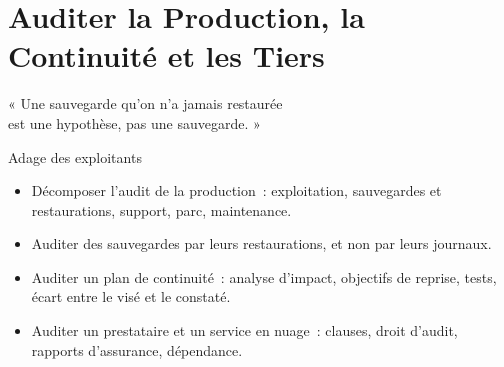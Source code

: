 
\chapter{Auditer la Production, la Continuité et les Tiers}
\label{chap:audit-continuite}

\epigraph{%
    « Une sauvegarde qu'on n'a jamais restaurée\\
    est une hypothèse, pas une sauvegarde. »%
}{Adage des exploitants}


\begin{boxobjectifs}
\begin{itemize}
    \item Décomposer l'audit de la production~: exploitation, sauvegardes et
          restaurations, support, parc, maintenance.
    \item Auditer des sauvegardes par leurs restaurations, et non par leurs
          journaux.
    \item Auditer un plan de continuité~: analyse d'impact, objectifs de
          reprise, tests, écart entre le visé et le constaté.
    \item Auditer un prestataire et un service en nuage~: clauses, droit
          d'audit, rapports d'assurance, dépendance.
\end{itemize}
\end{boxobjectifs}


